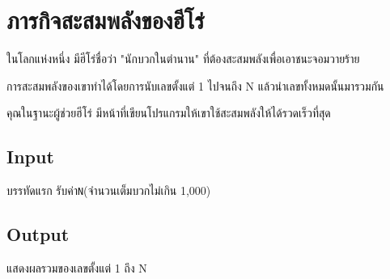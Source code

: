 \documentclass{article}
\begin{document}
\section*{ภารกิจสะสมพลังของฮีโร่}

ในโลกแห่งหนึ่ง มีฮีโร่ชื่อว่า "นักบวกในตำนาน" ที่ต้องสะสมพลังเพื่อเอาชนะจอมวายร้าย

การสะสมพลังของเขาทำได้โดยการนับเลขตั้งแต่ 1 ไปจนถึง N แล้วนำเลขทั้งหมดนั้นมารวมกัน



คุณในฐานะผู้ช่วยฮีโร่ มีหน้าที่เขียนโปรแกรมให้เขาใช้สะสมพลังให้ได้รวดเร็วที่สุด



\subsection*{Input}
บรรทัดแรก รับค่า\texttt{N}(จำนวนเต็มบวกไม่เกิน 1,000)\\



\subsection*{Output}
แสดงผลรวมของเลขตั้งแต่ 1 ถึง N\\
\end{document}
